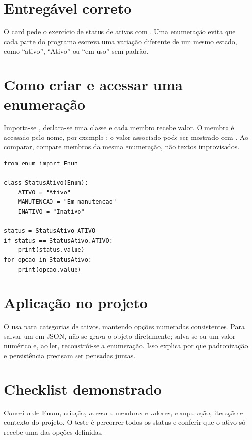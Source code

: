 \documentclass[11pt,a4paper]{article}
\begin{document}
\section*{Entregável correto}
O card pede o exercício de status de ativos com . Uma enumeração evita que cada parte do programa escreva uma variação diferente de um mesmo estado, como ``ativo'', ``Ativo'' ou ``em uso'' sem padrão.
\section*{Como criar e acessar uma enumeração}
Importa-se , declara-se uma classe e cada membro recebe valor. O membro é acessado pelo nome, por exemplo ; o valor associado pode ser mostrado com . Ao comparar, compare membros da mesma enumeração, não textos improvisados.
\begin{lstlisting}
from enum import Enum

class StatusAtivo(Enum):
    ATIVO = "Ativo"
    MANUTENCAO = "Em manutencao"
    INATIVO = "Inativo"

status = StatusAtivo.ATIVO
if status == StatusAtivo.ATIVO:
    print(status.value)
for opcao in StatusAtivo:
    print(opcao.value)
\end{lstlisting}
\section*{Aplicação no projeto}
O  usa  para categorias de ativos, mantendo opções numeradas consistentes. Para salvar um  em JSON, não se grava o objeto diretamente; salva-se  ou um valor numérico e, ao ler, reconstrói-se a enumeração. Isso explica por que padronização e persistência precisam ser pensadas juntas.
\section*{Checklist demonstrado}
Conceito de Enum, criação, acesso a membros e valores, comparação, iteração e contexto do projeto. O teste é percorrer todos os status e conferir que o ativo só recebe uma das opções definidas.
\end{document}
